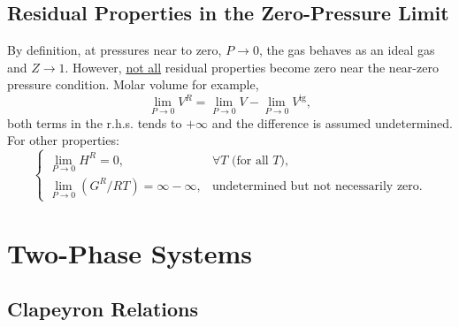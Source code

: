    \subsection{Residual Properties in the Zero-Pressure Limit}
      
       By definition, at pressures near to zero, \ie $P\rightarrow 0$, the gas behaves as an ideal gas and $Z\rightarrow 1$. However, \underline{not all} residual properties become zero near the near-zero pressure condition. Molar volume for example,
       \begin{displaymath}
           \lim\limits_{P\rightarrow 0}V^{R} = \lim\limits_{P\rightarrow 0}V - \lim\limits_{P\rightarrow 0}V^{\text{ig}},
       \end{displaymath}
both terms in the r.h.s. tends to $+\infty$ and the difference is assumed undetermined. For other properties:
       \begin{displaymath}
          \begin{cases}
             \lim\limits_{P\rightarrow 0}H^{R} = 0, & \forall T \text{ (for all $T$)}, \\
             \lim\limits_{P\rightarrow 0}\left(G^{R}/RT\right) = \infty-\infty,& \text{undetermined but not necessarily zero}.  
          \end{cases}
       \end{displaymath}


\section{Two-Phase Systems}\label{Section:03:Two_Phase}

   \subsection{Clapeyron Relations}\label{Section:03:ClapeyronRelations}

